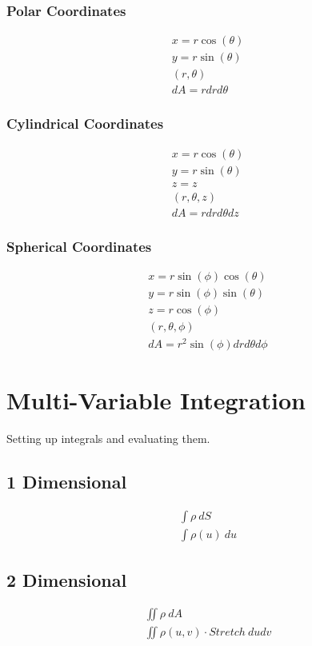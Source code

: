\documentclass{article}
\begin{document}
\subsubsection{Polar Coordinates}
\begin{gather*}
x=r\cos(\theta)\\
y=r\sin(\theta)\\
(r, \theta)\\
dA = r dr d\theta
\end{gather*}
\subsubsection{Cylindrical Coordinates}

\begin{gather*}
x=r\cos(\theta) \\
y=r\sin(\theta) \\
z=z \\
(r, \theta, z) \\
dA = r dr d\theta dz
\end{gather*}
\subsubsection{Spherical Coordinates}
\begin{gather*}
x = r\sin(\phi)\cos(\theta) \\
y = r\sin(\phi)\sin(\theta) \\
z = r\cos(\phi) \\
(r, \theta, \phi) \\
dA = r^2\sin(\phi) dr d\theta d\phi
\end{gather*}
\section{Multi-Variable Integration}
Setting up integrals and evaluating them.
\subsection{1 Dimensional}
\begin{gather*}
\int \rho\ dS \\
\int \rho(u)\ du
\end{gather*}
\subsection{2 Dimensional}
\begin{gather*}
\iint \rho\ dA \\
\iint \rho(u,v)\cdot Stretch\ dudv
\end{gather*}
\end{document}

